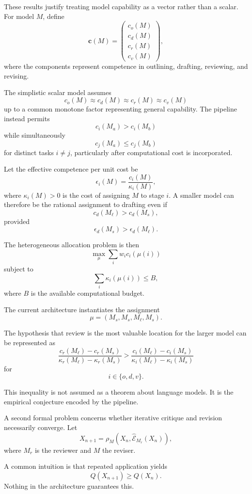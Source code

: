 \documentclass[11pt]{article}
\begin{document}
These results justify treating model capability as a vector rather than a scalar. For model \(M\), define
\[
    \mathbf{c}(M)
    =
    \begin{pmatrix}
        c_o(M)\\
        c_d(M)\\
        c_r(M)\\
        c_v(M)
    \end{pmatrix},
\]
where the components represent competence in outlining, drafting, reviewing, and revising.

The simplistic scalar model assumes
\[
    c_o(M)\approx c_d(M)\approx c_r(M)\approx c_v(M)
\]
up to a common monotone factor representing general capability. The pipeline instead permits
\[
    c_i(M_a)>c_i(M_b)
\]
while simultaneously
\[
    c_j(M_a)\leq c_j(M_b)
\]
for distinct tasks \(i\neq j\), particularly after computational cost is incorporated.

Let the effective competence per unit cost be
\[
    \epsilon_i(M)
    =
    \frac{c_i(M)}{\kappa_i(M)},
\]
where \(\kappa_i(M)>0\) is the cost of assigning \(M\) to stage \(i\). A smaller model can therefore be the rational assignment to drafting even if
\[
    c_d(M_\ell)>c_d(M_s),
\]
provided
\[
    \epsilon_d(M_s)>\epsilon_d(M_\ell).
\]

The heterogeneous allocation problem is then
\[
    \max_{\mu}
    \sum_i
    w_i c_i(\mu(i))
\]
subject to
\[
    \sum_i
    \kappa_i(\mu(i))
    \leq B,
\]
where \(B\) is the available computational budget.

The current architecture instantiates the assignment
\[
    \mu
    =
    (M_s,M_s,M_\ell,M_s).
\]

The hypothesis that review is the most valuable location for the larger model can be represented as
\[
    \frac{
        c_r(M_\ell)-c_r(M_s)
    }{
        \kappa_r(M_\ell)-\kappa_r(M_s)
    }
    >
    \frac{
        c_i(M_\ell)-c_i(M_s)
    }{
        \kappa_i(M_\ell)-\kappa_i(M_s)
    }
\]
for
\[
    i\in\{o,d,v\}.
\]

This inequality is not assumed as a theorem about language models. It is the empirical conjecture encoded by the pipeline.

A second formal problem concerns whether iterative critique and revision necessarily converge. Let
\[
    X_{n+1}
    =
    \rho_M
    \left(
        X_n,
        \widehat{\mathcal{E}}_{M_r}(X_n)
    \right),
\]
where \(M_r\) is the reviewer and \(M\) the reviser.

A common intuition is that repeated application yields
\[
    Q(X_{n+1})\geq Q(X_n).
\]
Nothing in the architecture guarantees this.
\end{document}
